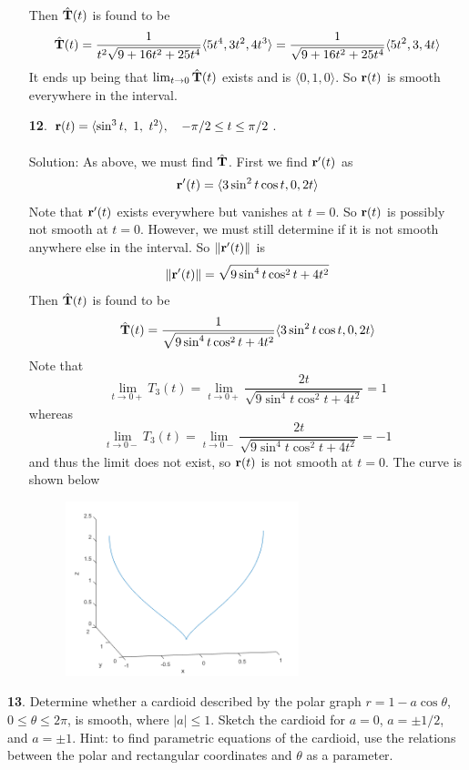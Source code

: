 \documentclass[12pt]{amsbook}
\newcommand{\la}{\langle}
\newcommand{\ra}{\rangle}
\begin{document}
\begin{enumerate}
  Then $\hat{\bf T}(t)$ is found to be
$$\hat{\bf T}(t)=\frac{1}{t^2\sqrt{9+16t^2+25t^4}}\la 5t^4,3t^2,4t^3 \ra=\frac{1}{\sqrt{9+16t^2+25t^4}}\la 5t^2,3,4t \ra$$
It ends up being that $\lim_{t \rightarrow 0}\hat{\bf T}(t)$ exists and is $\la 0,1,0\ra$. So ${\bf r}(t)$ is smooth everywhere in the interval.
\\
  \item[{\small\bf 12}.] ${\bf r}(t)=\la \sin^3 t, \ 1, \ t^2 \ra, \ \ \ -\pi/2 \leq t \leq \pi/2$.
  \\
  \\
  {\sc Solution}: As above, we must find $\hat{\bf T}$. First we find ${\bf r}'(t)$ as
  $${\bf r}'(t)=\la 3\sin^2t\cos t, 0, 2t \ra$$
  Note that ${\bf r}'(t)$ exists everywhere but vanishes at $t=0$. So ${\bf r}(t)$ is possibly not smooth at $t=0$. However, we must still determine if it is not smooth anywhere else in the interval. So $\|{\bf r}'(t)\|$ is
  $$\|{\bf r}'(t)\|=\sqrt{9\sin^4t\cos^2t+4t^2}$$
  Then $\hat{\bf T}(t)$ is found to be
$$\hat{\bf T}(t)=\frac{1}{\sqrt{9\sin^4t \cos^2t+4t^2}}\la 3\sin^2t\cos t, 0, 2t \ra$$
Note that 
$$\lim_{t \rightarrow 0+}T_3(t)=\lim_{t \rightarrow 0+}\frac{2t}{\sqrt{9\sin^4 t \cos^2 t+4t^2}}=1$$
whereas
$$\lim_{t \rightarrow 0-}T_3(t)=\lim_{t \rightarrow 0-}\frac{2t}{\sqrt{9\sin^4 t \cos^2 t+4t^2}}=-1$$
and thus the limit does not exist, so ${\bf r}(t)$ is not smooth at $t=0$. The curve is shown below
\begin{center}
\includegraphics[width=3.5in,height=2.0in]{2_11_12.png}
\end{center} 
\end{enumerate}
{\small\bf 13}. Determine whether a cardioid described by the polar graph $r = 1 -
a \cos \theta$, $0 \leq \theta \leq 2\pi$, is smooth, where $|a| \leq 1$. Sketch the cardioid for $a = 0$,
$a = \pm1/2$, and $a = \pm1$. Hint: to find parametric equations of the cardioid,
use the relations between the polar and rectangular coordinates and $\theta$ as a
parameter.
\\
\\
\end{document}
